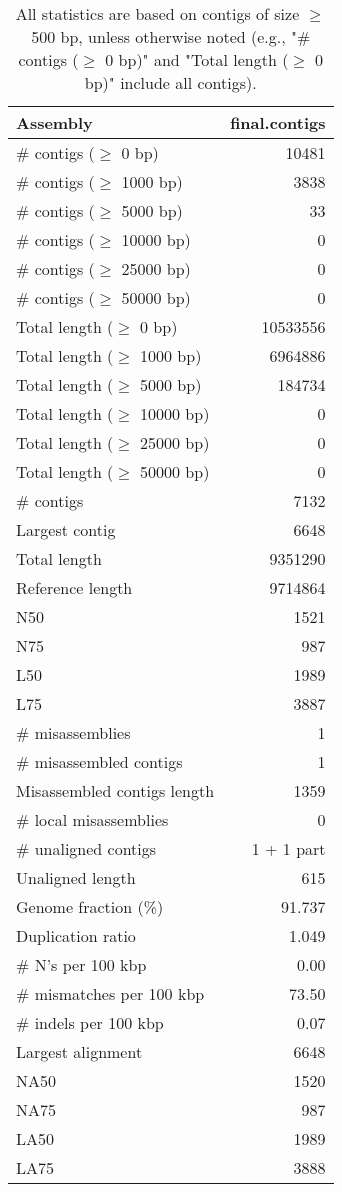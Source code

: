 \documentclass[12pt,a4paper]{article}
\begin{document}
\begin{table}[ht]
\begin{center}
\caption{All statistics are based on contigs of size $\geq$ 500 bp, unless otherwise noted (e.g., "\# contigs ($\geq$ 0 bp)" and "Total length ($\geq$ 0 bp)" include all contigs).}
\begin{tabular}{|l*{1}{|r}|}
\hline
Assembly & final.contigs \\ \hline
\# contigs ($\geq$ 0 bp) & 10481 \\ \hline
\# contigs ($\geq$ 1000 bp) & 3838 \\ \hline
\# contigs ($\geq$ 5000 bp) & 33 \\ \hline
\# contigs ($\geq$ 10000 bp) & 0 \\ \hline
\# contigs ($\geq$ 25000 bp) & 0 \\ \hline
\# contigs ($\geq$ 50000 bp) & 0 \\ \hline
Total length ($\geq$ 0 bp) & 10533556 \\ \hline
Total length ($\geq$ 1000 bp) & 6964886 \\ \hline
Total length ($\geq$ 5000 bp) & 184734 \\ \hline
Total length ($\geq$ 10000 bp) & 0 \\ \hline
Total length ($\geq$ 25000 bp) & 0 \\ \hline
Total length ($\geq$ 50000 bp) & 0 \\ \hline
\# contigs & 7132 \\ \hline
Largest contig & 6648 \\ \hline
Total length & 9351290 \\ \hline
Reference length & 9714864 \\ \hline
N50 & 1521 \\ \hline
N75 & 987 \\ \hline
L50 & 1989 \\ \hline
L75 & 3887 \\ \hline
\# misassemblies & 1 \\ \hline
\# misassembled contigs & 1 \\ \hline
Misassembled contigs length & 1359 \\ \hline
\# local misassemblies & 0 \\ \hline
\# unaligned contigs & 1 + 1 part \\ \hline
Unaligned length & 615 \\ \hline
Genome fraction (\%) & 91.737 \\ \hline
Duplication ratio & 1.049 \\ \hline
\# N's per 100 kbp & 0.00 \\ \hline
\# mismatches per 100 kbp & 73.50 \\ \hline
\# indels per 100 kbp & 0.07 \\ \hline
Largest alignment & 6648 \\ \hline
NA50 & 1520 \\ \hline
NA75 & 987 \\ \hline
LA50 & 1989 \\ \hline
LA75 & 3888 \\ \hline
\end{tabular}
\end{center}
\end{table}
\end{document}
